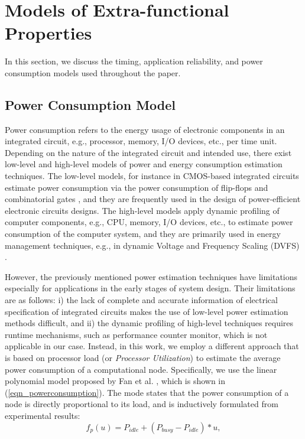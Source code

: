 \section{Models of Extra-functional Properties}\label{sec_extrafunc}
In this section, we discuss the timing, application reliability, and power consumption models used throughout the paper.

\subsection{Power Consumption Model}
Power consumption refers to the energy usage of electronic components in an integrated circuit, e.g., processor, memory, I/O devices, etc., per time unit. Depending on the nature of the integrated circuit and intended use, there exist low-level and high-level models of power and energy consumption estimation techniques. The low-level models, for instance in CMOS-based integrated circuits estimate power consumption via the power consumption of flip-flops and combinatorial gates \cite{Najm1994ACircuits}\cite{Najm1995PowerCircuits}, and they are frequently used in the design of power-efficient electronic circuits designs. The high-level models apply dynamic profiling of computer components, e.g., CPU, memory, I/O devices, etc., to estimate power consumption of the computer system, and they are primarily used in energy management techniques, e.g., in dynamic Voltage and Frequency Scaling (DVFS) \cite{Contreras2005PowerEvents}.

However, the previously mentioned power estimation techniques have limitations especially for applications in the early stages of system design. Their limitations are as follows: i) the lack of complete and accurate information of electrical specification of integrated circuits makes the use of low-level power estimation methods difficult, and ii) the dynamic profiling of high-level techniques requires runtime mechanisms, such as performance counter monitor, which is not applicable in our case. Instead, in this work, we employ a different approach that is based on processor load (or \textit{Processor Utilization}) to estimate the average power consumption of a computational node. Specifically, we use the linear polynomial model proposed by Fan et al. \cite{Fan2007PowerComputer}, which is shown in (\ref{eqn_powerconsumption}). The mode states that the power consumption of a node is directly proportional to its load, and is inductively formulated from experimental results:
\begin{equation}
\label{eqn_powerconsumption}
f_p(u)=P_{idle} + (P_{busy}-P_{idle})*u,
\end{equation}

